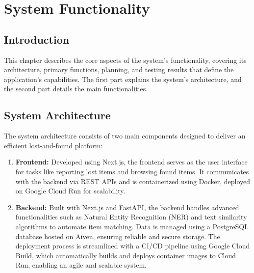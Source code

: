 \chapter{System Functionality}

\section{Introduction}
This chapter describes the core aspects of the system's functionality, covering its architecture, primary functions, planning, and testing results that define the application’s capabilities. The first part explains the system’s architecture, and the second part details the main functionalities.

\section{System Architecture}
The system architecture consists of two main components designed to deliver an efficient lost-and-found platform:
\begin{enumerate}
    \item \textbf{Frontend:} Developed using Next.js, the frontend serves as the user interface for tasks like reporting lost items and browsing found items. It communicates with the backend via REST APIs and is containerized using Docker, deployed on Google Cloud Run for scalability.
    \item \textbf{Backend:} Built with Next.js and FastAPI, the backend handles advanced functionalities such as Natural Entity Recognition (NER) and text similarity algorithms to automate item matching. Data is managed using a PostgreSQL database hosted on Aiven, ensuring reliable and secure storage. The deployment process is streamlined with a CI/CD pipeline using Google Cloud Build, which automatically builds and deploys container images to Cloud Run, enabling an agile and scalable system.
\end{enumerate}

